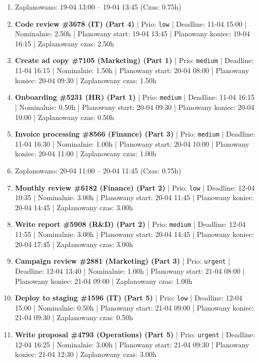 {\begin{enumerate}
  \item [\textbf{PRZERWA}] Zaplanowano: 19-04 13:00 -- 19-04 13:45 (Czas: 0.75h)
  \item [\textbf{14699}] \textbf{Code review \#3678 (IT) (Part 4)} | Prio: \texttt{low} | Deadline: 11-04 15:00 | Nominalnie: 2.50h | Planowany start: 19-04 13:45 | Planowany koniec: 19-04 16:15 | Zaplanowany czas: 2.50h
  \item [\textbf{14650}] \textbf{Create ad copy \#7105 (Marketing) (Part 1)} | Prio: \texttt{medium} | Deadline: 11-04 16:15 | Nominalnie: 1.50h | Planowany start: 20-04 08:00 | Planowany koniec: 20-04 09:30 | Zaplanowany czas: 1.50h
  \item [\textbf{14671}] \textbf{Onboarding \#5231 (HR) (Part 1)} | Prio: \texttt{medium} | Deadline: 11-04 16:15 | Nominalnie: 0.50h | Planowany start: 20-04 09:30 | Planowany koniec: 20-04 10:00 | Zaplanowany czas: 0.50h
  \item [\textbf{14675}] \textbf{Invoice processing \#8566 (Finance) (Part 3)} | Prio: \texttt{medium} | Deadline: 11-04 16:30 | Nominalnie: 1.00h | Planowany start: 20-04 10:00 | Planowany koniec: 20-04 11:00 | Zaplanowany czas: 1.00h
  \item [\textbf{PRZERWA}] Zaplanowano: 20-04 11:00 -- 20-04 11:45 (Czas: 0.75h)
  \item [\textbf{14690}] \textbf{Monthly review \#6182 (Finance) (Part 2)} | Prio: \texttt{low} | Deadline: 12-04 10:35 | Nominalnie: 3.00h | Planowany start: 20-04 11:45 | Planowany koniec: 20-04 14:45 | Zaplanowany czas: 3.00h
  \item [\textbf{14674}] \textbf{Write report \#5908 (R\&D) (Part 2)} | Prio: \texttt{medium} | Deadline: 12-04 11:55 | Nominalnie: 3.00h | Planowany start: 20-04 14:45 | Planowany koniec: 20-04 17:45 | Zaplanowany czas: 3.00h
  \item [\textbf{14599}] \textbf{Campaign review \#2881 (Marketing) (Part 3)} | Prio: \texttt{urgent} | Deadline: 12-04 13:40 | Nominalnie: 1.00h | Planowany start: 21-04 08:00 | Planowany koniec: 21-04 09:00 | Zaplanowany czas: 1.00h
  \item [\textbf{14692}] \textbf{Deploy to staging \#1596 (IT) (Part 5)} | Prio: \texttt{low} | Deadline: 12-04 15:00 | Nominalnie: 0.50h | Planowany start: 21-04 09:00 | Planowany koniec: 21-04 09:30 | Zaplanowany czas: 0.50h
  \item [\textbf{14600}] \textbf{Write proposal \#4793 (Operations) (Part 5)} | Prio: \texttt{urgent} | Deadline: 12-04 16:25 | Nominalnie: 3.00h | Planowany start: 21-04 09:30 | Planowany koniec: 21-04 12:30 | Zaplanowany czas: 3.00h

\end{enumerate}}
